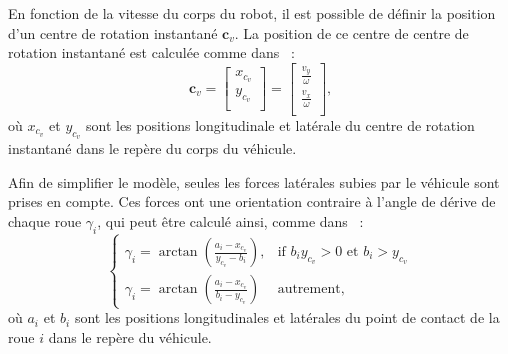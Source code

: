 En fonction de la vitesse du corps du robot, il est possible de définir la position d'un centre de rotation instantané $\bm c_v$.
La position de ce centre de centre de rotation instantané est calculée comme dans~\citep{Mandow2007} :
\begin{equation}
	\bm c_v = \begin{bmatrix}
	x_{c_v} \\ 
	y_{c_v} \\
	\end{bmatrix} = \begin{bmatrix}
	\frac{v_y}{\omega} \\ 
	\frac{v_x}{\omega} \\
	\end{bmatrix} \text{,}
	\label{eqn:icr}
\end{equation}
où $x_{c_v}$ et $y_{c_v}$ sont les positions longitudinale et latérale du centre de rotation instantané dans le repère du corps du véhicule.

Afin de simplifier le modèle, seules les forces latérales subies par le véhicule sont prises en compte.
Ces forces ont une orientation contraire à l'angle de dérive de chaque roue $\gamma_i$, qui peut être calculé ainsi, comme dans~\citep{Maclaurin2011} :
\begin{equation}
\begin{cases}
	\gamma_i = \arctan(\frac{a_i - x_{c_v}}{y_{c_v} - b_i}), & \text{if } b_i y_{c_v} > 0 \text{ et } b_i > y_{c_v} \\
	\gamma_i = \arctan(\frac{a_i - x_{c_v}}{b_i - y_{c_v}}) & \text{autrement} \text{,}
\end{cases}
\label{eqn:angles}
\end{equation}
où $a_i$ et $b_i$ sont les positions longitudinales et latérales du point de contact de la roue $i$ dans le repère du véhicule.

